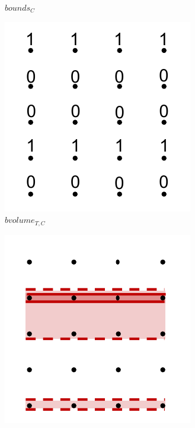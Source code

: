 \begin{figure}[!t]
\begin{subfigure}{0.243\linewidth}
\vspace{-5mm}
\caption{$bounds_{C}$}
\label{fig:boundsC}
\end{subfigure}
\begin{subfigure}{0.243\linewidth}
\includegraphics[width=\linewidth]{Images/bvolumeTC.pdf}
\vspace{-5mm}
\caption{$bvolume_{T,C}$}
\label{fig:bvolumeTC}
\end{subfigure}
\begin{subfigure}{0.243\linewidth}
\includegraphics[width=\linewidth]{Images/zlsT_fclsTC.pdf}

\end{subfigure}
\end{figure}

